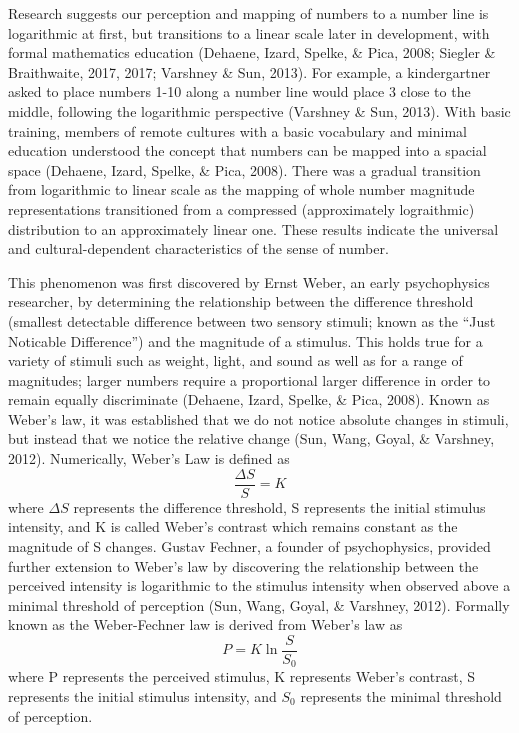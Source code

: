 \documentclass[print]{nuthesis}
\begin{document}
Research suggests our perception and mapping of numbers to a number line is logarithmic at first, but transitions
to a linear scale later in development, with formal mathematics education (Dehaene, Izard, Spelke, \& Pica, 2008; Siegler \& Braithwaite, 2017, 2017; Varshney \& Sun, 2013).
For example, a kindergartner asked to place numbers 1-10 along a number line would place 3 close to the middle, following the logarithmic perspective (Varshney \& Sun, 2013).
With basic training, members of remote cultures with a basic vocabulary and minimal education understood the concept that numbers can be mapped into a spacial space (Dehaene, Izard, Spelke, \& Pica, 2008). There was a gradual transition from logarithmic to linear scale as the mapping of whole number magnitude representations transitioned from a compressed (approximately lograithmic) distribution to an approximately linear one.
These results indicate the universal and cultural-dependent characteristics of the sense of number.

This phenomenon was first discovered by Ernst Weber, an early psychophysics researcher, by determining the relationship between the difference threshold (smallest detectable difference between two sensory stimuli; known as the ``Just Noticable Difference'') and the magnitude of a stimulus.
This holds true for a variety of stimuli such as weight, light, and sound as well as for a range of magnitudes; larger numbers require a proportional larger difference in order to remain equally discriminate (Dehaene, Izard, Spelke, \& Pica, 2008).
Known as Weber's law, it was established that we do not notice absolute changes in stimuli, but instead that we notice the relative change (Sun, Wang, Goyal, \& Varshney, 2012).
Numerically, Weber's Law is defined as
\begin{equation}
\frac{\Delta S}{S} = K
\end{equation}
where \(\Delta S\) represents the difference threshold, S represents the initial stimulus intensity, and K is called Weber's contrast which remains constant as the magnitude of S changes.
Gustav Fechner, a founder of psychophysics, provided further extension to Weber's law by discovering the relationship between the perceived intensity is logarithmic to the stimulus intensity when observed above a minimal threshold of perception (Sun, Wang, Goyal, \& Varshney, 2012).
Formally known as the Weber-Fechner law is derived from Weber's law as
\begin{equation}
P = K\ln \frac{S}{S_0}
\end{equation}
where P represents the perceived stimulus, K represents Weber's contrast, S represents the initial stimulus intensity, and \(S_0\) represents the minimal threshold of perception.
\end{document}
